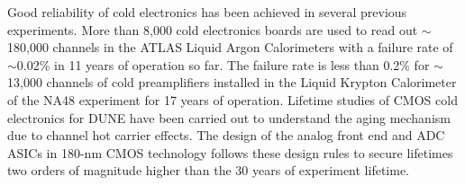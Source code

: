 Good reliability of cold electronics has been achieved in several
previous experiments. More than 8,000 cold electronics boards are used
to read out $\sim$180,000 channels in the ATLAS Liquid Argon
Calorimeters with a failure rate of $\sim$0.02\% in 11 years of
operation so far. The failure rate is less than 0.2\% for $\sim$13,000
channels of cold preamplifiers installed in the Liquid Krypton
Calorimeter of the NA48 experiment for 17 years of operation. Lifetime
studies of CMOS cold electronics for DUNE have been carried out to
understand the aging mechanism due to channel hot carrier
effects\cite{Li:CELAr}.  The design of the analog front end and ADC
ASICs in 180-nm CMOS technology follows these design rules to secure
lifetimes two orders of magnitude higher than the 30 years of
experiment lifetime. 
